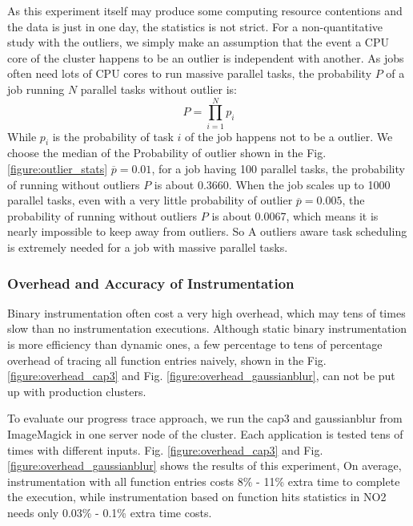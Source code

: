 As this experiment itself may produce some computing resource contentions and the data is just in one day, the statistics is not strict. For a non-quantitative study with the outliers, we simply make an assumption that the event a CPU core of the cluster happens to be an outlier is independent with another. As jobs often need lots of CPU cores to run massive parallel tasks, the probability $P$ of a job running $N$ parallel tasks without outlier is:
$$P = \prod_{i=1}^N p_i$$
While $p_i$ is the probability of task $i$ of the job happens not to be a outlier. We choose the median of the Probability of outlier shown in the Fig. \ref{figure:outlier_stats} $\overline{p} = 0.01$, for a job having 100 parallel tasks, the probability of running without outliers $P$ is about 0.3660. When the job scales up to 1000 parallel tasks, even with a very little probability of outlier $\overline{p} = 0.005$, the probability of running without outliers $P$ is about 0.0067, which means it is nearly impossible to keep away from outliers. So A outliers aware task scheduling is extremely needed for a job with massive parallel tasks.

\subsubsection{Overhead and Accuracy of Instrumentation}

Binary instrumentation often cost a very high overhead, which may tens of times slow than no instrumentation executions. Although static binary instrumentation is more efficiency than dynamic ones, a few percentage to tens of percentage overhead of tracing all function entries naively, shown in the Fig. \ref{figure:overhead_cap3} and Fig. \ref{figure:overhead_gaussianblur}, can not be put up with production clusters. 

To evaluate our progress trace approach, we run the cap3 and gaussianblur from ImageMagick in one server node of the cluster. Each application is tested tens of times with different inputs. Fig. \ref{figure:overhead_cap3} and Fig. \ref{figure:overhead_gaussianblur} shows the results of this experiment, On average, instrumentation with all function entries costs 8\% - 11\% extra time to complete the execution, while instrumentation based on function hits statistics in NO2 needs only 0.03\% - 0.1\% extra time costs.

